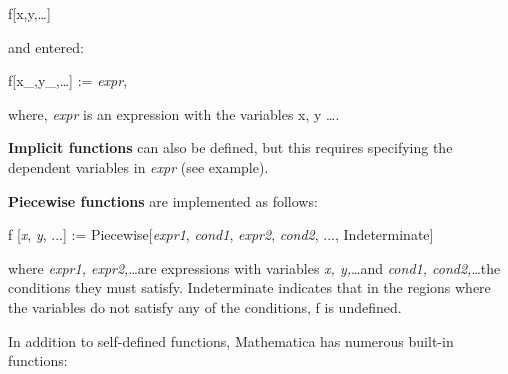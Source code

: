 \begin{center}
	f[x,y,\ldots]
\end{center}

and entered:

\begin{center}
	f[x\_,y\_,\ldots] := \textit{expr},
\end{center}


where, \textit{expr} is an expression with the variables x, y \ldots .

\textbf{Implicit functions} can also be defined, but this requires specifying the dependent variables in \textit{expr} (see example).

\textbf{Piecewise functions} are implemented as follows:

\begin{center}
	f [\textit{x}\textunderscore ,\textit{ y}\textunderscore, ...] :=  Piecewise[{{\textit{expr1}, \textit{cond1}}, {\textit{expr2}, \textit{cond2}}, ...}, Indeterminate]
\end{center}



where \textit{expr1, expr2,}\ldots  are expressions with variables \textit{x, y,}\ldots and \textit{cond1, cond2,}\ldots the conditions they must satisfy. Indeterminate indicates that in the regions where the variables do not satisfy any of the conditions, f is undefined.
   
In addition to self-defined functions, Mathematica has numerous built-in functions:

